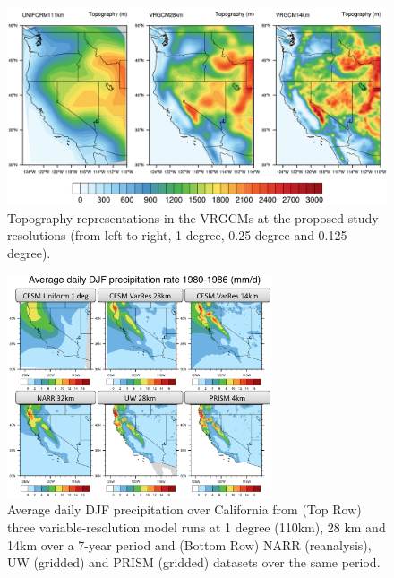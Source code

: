 \documentclass[11pt]{article}
\begin{document}
\begin{figure}
  \begin{center}
  \includegraphics[width=6in]{ModelTopography_Proposal.png}
  \caption{Topography representations in the VRGCMs at the proposed study resolutions (from left to right, 1 degree, 0.25 degree and 0.125 degree).} \label{f3}
  \end{center}
\end{figure}

\begin{figure}
\begin{center}
\includegraphics[width=0.7\textwidth]{VariableResolutionPrecipitation.png}
\end{center}
\caption{Average daily DJF precipitation over California from (Top Row) three variable-resolution model runs at 1 degree (110km), 28 km and 14km over a 7-year period and (Bottom Row) NARR (reanalysis), UW (gridded) and PRISM (gridded) datasets over the same period.} \label{fig:VarResPrecipitation}
\end{figure}
\end{document}
